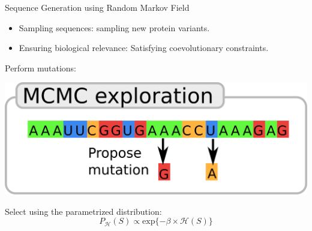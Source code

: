 \documentclass[presentation,smaller]{beamer}
\begin{document}
\begin{frame}[label={sec:org3696fe2}]{Sequence Generation using Random Markov Field}
\begin{itemize}
\item Sampling sequences: sampling new protein variants.
\item Ensuring biological relevance: Satisfying coevolutionary constraints.
\end{itemize}

Perform mutations:
\begin{center}
\begin{center}
\includegraphics[scale=0.3]{./img/mcmc_seq.png}
\end{center}
\end{center}

Select using the parametrized distribution:
\begin{equation*}
P_{\mathcal{H}}(S) \propto \text{exp}\{-\beta \times \mathcal{H}(S)\}
\end{equation*}
\end{frame}
\end{document}
